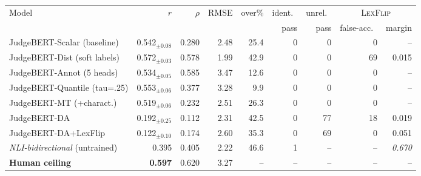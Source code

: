 \setlength{\tabcolsep}{4pt}
\begin{tabular}{lrrrrrrrr}
\toprule
Model & $r$ & $\rho$ & RMSE & over\% & ident.\ & unrel.\ & \multicolumn{2}{c}{\textsc{LexFlip}} \\
\cmidrule(lr){8-9}
 &  &  &  &  & pass & pass & false-acc.\ & margin \\
\midrule
JudgeBERT-Scalar (baseline) & 0.542$_{\pm0.08}$ & 0.280 & 2.48 & 25.4 & 0 & 0 & 0 & -- \\
JudgeBERT-Dist (soft labels) & 0.572$_{\pm0.03}$ & 0.578 & 1.99 & 42.9 & 0 & 0 & 69 & 0.015 \\
JudgeBERT-Annot (5 heads) & 0.534$_{\pm0.05}$ & 0.585 & 3.47 & 12.6 & 0 & 0 & 0 & -- \\
JudgeBERT-Quantile (tau=.25) & 0.553$_{\pm0.06}$ & 0.377 & 3.28 & 9.9 & 0 & 0 & 0 & -- \\
JudgeBERT-MT (+charact.) & 0.519$_{\pm0.06}$ & 0.232 & 2.51 & 26.3 & 0 & 0 & 0 & -- \\
\midrule
JudgeBERT-DA & 0.192$_{\pm0.25}$ & 0.112 & 2.31 & 42.5 & 0 & 77 & 18 & 0.019 \\
JudgeBERT-DA+LexFlip & 0.122$_{\pm0.10}$ & 0.174 & 2.60 & 35.3 & 0 & 69 & 0 & 0.051 \\
\midrule
\emph{NLI-bidirectional} (untrained) & 0.395 & 0.405 & 2.22 & 46.6 & 1 & -- & -- & \emph{0.670} \\
\textbf{Human ceiling} & \textbf{0.597} & 0.620 & 3.27 & -- & -- & -- & -- & -- \\
\bottomrule
\end{tabular}